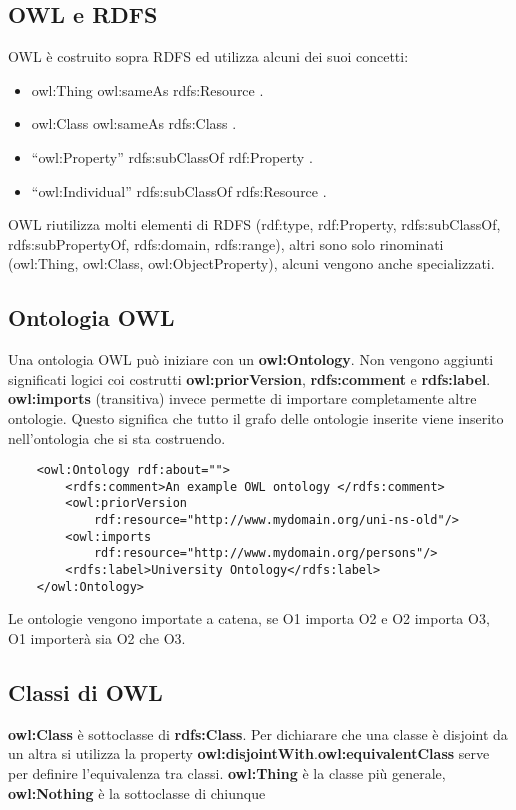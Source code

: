 \subsection{OWL e RDFS}
OWL è costruito sopra RDFS ed utilizza alcuni dei suoi concetti:
\begin{itemize}
	\item owl:Thing owl:sameAs rdfs:Resource .
	\item owl:Class owl:sameAs rdfs:Class .
	\item “owl:Property” rdfs:subClassOf rdf:Property .
	\item “owl:Individual” rdfs:subClassOf rdfs:Resource .
\end{itemize}

OWL riutilizza molti elementi di RDFS (rdf:type, rdf:Property, rdfs:subClassOf, rdfs:subPropertyOf,
rdfs:domain, rdfs:range), altri sono solo rinominati (owl:Thing, owl:Class, owl:ObjectProperty), alcuni vengono anche specializzati.

\subsection{Ontologia OWL}
Una ontologia OWL può iniziare con un \textbf{owl:Ontology}. Non vengono aggiunti significati logici coi costrutti \textbf{owl:priorVersion}, \textbf{rdfs:comment} e \textbf{rdfs:label}. \textbf{owl:imports} (transitiva) invece permette di importare completamente altre ontologie. Questo significa che tutto il grafo delle ontologie inserite viene inserito nell'ontologia che si sta costruendo.

\begin{verbatim}
	<owl:Ontology rdf:about="">
		<rdfs:comment>An example OWL ontology </rdfs:comment>
		<owl:priorVersion
			rdf:resource="http://www.mydomain.org/uni-ns-old"/>
		<owl:imports
			rdf:resource="http://www.mydomain.org/persons"/>
		<rdfs:label>University Ontology</rdfs:label>
	</owl:Ontology>
\end{verbatim}

Le ontologie vengono importate a catena, se O1 importa O2 e O2 importa O3, O1 importerà sia O2 che O3.

\subsection{Classi di OWL}

\textbf{owl:Class} è sottoclasse di \textbf{rdfs:Class}. Per dichiarare che una classe è disjoint da un altra si utilizza la property \textbf{owl:disjointWith}.\textbf{owl:equivalentClass} serve per definire l'equivalenza tra classi. \textbf{owl:Thing} è la classe più generale, \textbf{owl:Nothing} è la sottoclasse di chiunque 

